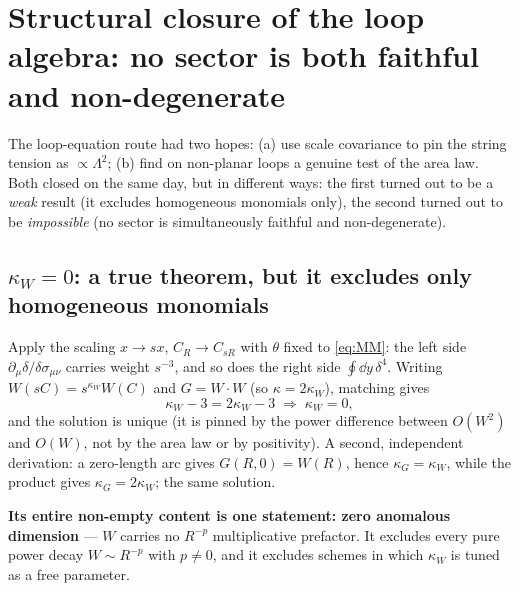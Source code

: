 \section{Structural closure of the loop algebra: no sector is both faithful and non-degenerate}
\label{sec:loop}

The loop-equation route had two hopes: (a) use scale covariance to pin the string tension as
$\propto\Lambda^{2}$; (b) find on non-planar loops a genuine test of the area law. Both closed on the
same day, but in different ways: the first turned out to be a \emph{weak} result (it excludes
homogeneous monomials only), the second turned out to be \emph{impossible} (no sector is
simultaneously faithful and non-degenerate).

\subsection{$\kappa_W=0$: a true theorem, but it excludes only homogeneous monomials}

Apply the scaling $x\to sx$, $C_R\to C_{sR}$ with $\theta$ fixed to \eqref{eq:MM}: the left side
$\partial_\mu\delta/\delta\sigma_{\mu\nu}$ carries weight $s^{-3}$, and so does the right side
$\oint\dd y\,\delta^{4}$. Writing $W(sC)=s^{\kappa_W}W(C)$ and $G=W\cdot W$ (so $\kappa=2\kappa_W$),
matching gives
\begin{equation}
  \kappa_W-3=2\kappa_W-3 \;\Longrightarrow\; \kappa_W=0 ,
\end{equation}
and the solution is unique (it is pinned by the power difference between $O(W^{2})$ and $O(W)$, not
by the area law or by positivity). A second, independent derivation: a zero-length arc gives
$G(R,0)=W(R)$, hence $\kappa_G=\kappa_W$, while the product gives $\kappa_G=2\kappa_W$; the same
solution. \LT
{}

\noindent
\textbf{Its entire non-empty content is one statement: zero anomalous dimension} --- $W$ carries no
$R^{-p}$ multiplicative prefactor. It excludes every pure power decay $W\sim R^{-p}$ with $p\neq0$,
and it excludes schemes in which $\kappa_W$ is tuned as a free parameter. \LT
{}

